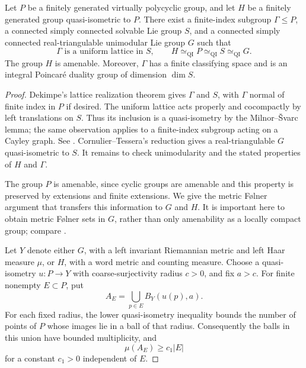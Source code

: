 \begin{lemma}\label{lem:model-reduction}
Let $P$ be a finitely generated virtually polycyclic group, and let $H$ be
a finitely generated group quasi-isometric to $P$.  There exist a
finite-index subgroup $\Gamma\leq P$, a connected simply connected
solvable Lie group $S$, and a connected simply connected real-triangulable
unimodular Lie group $G$ such that
\[
 \Gamma\text{ is a uniform lattice in }S,
 \qquad H\simeq_{\mathrm{QI}}P\simeq_{\mathrm{QI}}S
             \simeq_{\mathrm{QI}}G.
\]
The group $H$ is amenable.  Moreover, $\Gamma$ has a finite classifying
space and is an integral Poincar\'e duality group of dimension $\dim S$.
\end{lemma}

\begin{proof}
Dekimpe's lattice realization theorem
\cite[Theorem~4.1]{Dekimpe2000} gives $\Gamma$ and $S$, with $\Gamma$
normal of finite index in $P$ if desired.  The uniform lattice acts
properly and cocompactly by left translations on $S$.  Thus its inclusion
is a quasi-isometry by the Milnor--\v{S}varc lemma; the same observation
applies to a finite-index subgroup acting on a Cayley graph.  See
\cite[Theorem~4.C.5(1) and Proposition~4.C.11(3)]{CornulierDeLaHarpe2016}.
Cornulier--Tessera's reduction
\cite[Lemma~3.A.1]{CornulierTessera2017} gives a real-triangulable $G$
quasi-isometric to $S$.  It remains to check unimodularity and the stated
properties of $H$ and $\Gamma$.

The group $P$ is amenable, since cyclic groups are amenable and this
property is preserved by extensions and finite extensions.  We give the
metric F\o lner argument that transfers this information to $G$ and $H$.
It is important here to obtain metric F\o lner sets in $G$, rather than
only amenability as a locally compact group; compare
\cite[Proposition~11.11 and Corollary~11.13]{Tessera2008}.

Let $Y$ denote either $G$, with a left invariant Riemannian metric and
left Haar measure $\mu$, or $H$, with a word metric and counting measure.
Choose a quasi-isometry $u:P\to Y$ with coarse-surjectivity radius $c>0$,
and fix $a>c$.  For finite nonempty $E\subset P$, put
\[
 A_E=\bigcup_{p\in E} B_Y(u(p),a).
\]
For each fixed radius, the lower quasi-isometry inequality bounds the
number of points of $P$ whose images lie in a ball of that radius.
Consequently the balls in this union have bounded multiplicity, and
\begin{equation}\label{eq:recognition-folner-lower}
 \mu(A_E)\geq c_1|E|
\end{equation}
for a constant $c_1>0$ independent of $E$.


\end{proof}

